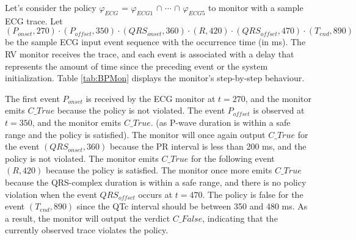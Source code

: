 	
\begin{example}	
	Let's consider the policy $\varphi_{ECG}$ = $\varphi_{ECG1}$ $\cap$ $\cdots$ $\cap$ $\varphi_{ECG5}$ to monitor with a sample ECG trace. Let $(P_{onset},270)\cdot(P_{offset},350)\cdot(QRS_{onset},360)\cdot(R,420) \cdot (QRS_{offset}, 470) \cdot (T_{end}, 890)$ be the sample ECG input event sequence with the occurrence time (in ms). The RV monitor receives the trace, and each event is associated with a delay that represents the amount of time since the preceding event or the system initialization. Table \ref{tab:BPMon} displays the monitor's step-by-step behaviour.
	
	The first event $P_{onset}$ is received by the ECG monitor at $t=270$, and the monitor emits $C\_True$ because the policy is not violated. The event $P_{offset}$ is observed at $t=350$, and the monitor emits $C\_True$. (as P-wave duration is within a safe range and the policy is satisfied). The monitor will once again output $C\_True$ for the event $(QRS_{onset},360)$ because the PR interval is less than 200 ms, and the policy is not violated. The monitor emits $C\_True$ for the following event $(R,420)$ because the policy is satisfied. The monitor once more emits $C\_True$ because the QRS-complex duration is within a safe range, and there is no policy violation when the event $QRS_{offset}$ occurs at $t=470$. The policy is false for the event $(T_{end}, 890)$ since the QTc interval should be between 350 and 480 ms. As a result, the monitor will output the verdict $C\_False$, indicating that the currently observed trace violates the policy.	
\end{example}	

